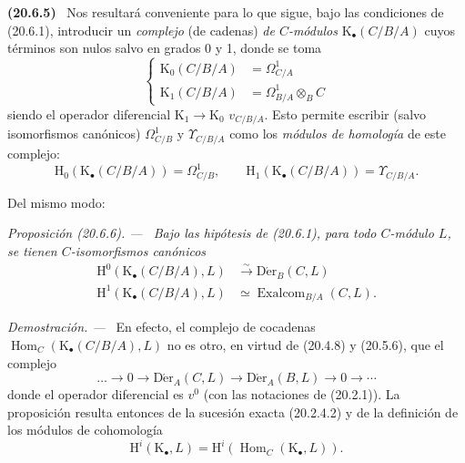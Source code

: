 \documentclass[10pt,oneside]{book}
\makeatletter
\newcommand{\setmanualcurrentlabel}[1]{\def\@currentlabel{#1}}
\newcommand{\oldpage}[2][]{%
  \setcounter{footnote}{0}%
  \marginpar{\scriptsize\textbf{#1}~|~#2}\ignorespaces}
\newenvironment{env}[1][]{\setmanualcurrentlabel{#1}\par\medskip\noindent\textbf{(#1)}\ }{\par}
\newenvironment{proposition}[1][]{%
  \setmanualcurrentlabel{#1}\par\medskip\noindent\itshape Proposición (#1). ---\ }{\par}
\newenvironment{proof}{%
  \par\medskip\noindent\textit{Demostración. ---\ }}{\par}
\makeatother
\begin{document}
\begin{env}[20.6.5]
\label{0.20.6.5-es}
Nos resultará conveniente para lo que sigue, bajo las condiciones de (20.6.1),
introducir un \emph{complejo} (de cadenas) \emph{de $C$-módulos}
$\mathrm{K}_\bullet(C/B/A)$ cuyos términos son nulos salvo en grados 0
y 1, donde se toma
\begin{equation}
\tag{20.6.5.1}
\label{0.20.6.5.1-es}
\left\{
\begin{aligned}
  \mathrm{K}_0(C/B/A)&=\Omega^1_{C/A}\\
  \mathrm{K}_1(C/B/A)&=\Omega^1_{B/A}\otimes_B C
\end{aligned}
\right.
\end{equation}
siendo el operador diferencial $\mathrm{K}_1\to\mathrm{K}_0$
$v_{C/B/A}$. Esto permite escribir (salvo isomorfismos canónicos)
$\Omega^1_{C/B}$ y $\Upsilon_{C/B/A}$ como los \emph{módulos
de homología} de este complejo:
\begin{equation}
\tag{20.6.5.2}
\label{0.20.6.5.2-es}
  \mathrm{H}_0(\mathrm{K}_\bullet(C/B/A))=\Omega^1_{C/B},\qquad
  \mathrm{H}_1(\mathrm{K}_\bullet(C/B/A))=\Upsilon_{C/B/A}.
\end{equation}
\end{env}

Del mismo modo:
\begin{proposition}[20.6.6]
\label{0.20.6.6-es}
Bajo las hipótesis de \textup{(20.6.1)}, para todo $C$-módulo $L$, se tienen
$C$-isomorfismos canónicos
\begin{align}
\tag{20.6.6.1}
\label{0.20.6.6.1-es}
  \mathrm{H}^0(\mathrm{K}_\bullet(C/B/A),L)&\xrightarrow{\sim}\operatorname{D\acute{e}r}_B(C,L)\\
\tag{20.6.6.2}
\label{0.20.6.6.2-es}
  \mathrm{H}^1(\mathrm{K}_\bullet(C/B/A),L)&\simeq
  \operatorname{Exalcom}_{B/A}(C,L).
\end{align}
\end{proposition}

\begin{proof}
En efecto, el complejo de cocadenas
$\operatorname{Hom}_C(\mathrm{K}_\bullet(C/B/A),L)$ no es otro, en virtud de
(20.4.8)
y (20.5.6), que el complejo
\[
  \ldots\longrightarrow0\longrightarrow\operatorname{D\acute{e}r}_A(C,L)
  \longrightarrow\operatorname{D\acute{e}r}_A(B,L)\longrightarrow0\longrightarrow\cdots
\]
\oldpage[0\textsubscript{IV-1}]{138}
donde el operador diferencial es $v^0$ (con las notaciones de (20.2.1)).
La proposición resulta entonces de la sucesión exacta (20.2.4.2) y de la
definición de los módulos de cohomología
\begin{equation}
\tag{20.6.6.3}
\label{0.20.6.6.3-es}
  \mathrm{H}^i(\mathrm{K}_\bullet,L)=
  \mathrm{H}^i(\operatorname{Hom}_C(\mathrm{K}_\bullet,L)).
\end{equation}
\end{proof}
\end{document}
